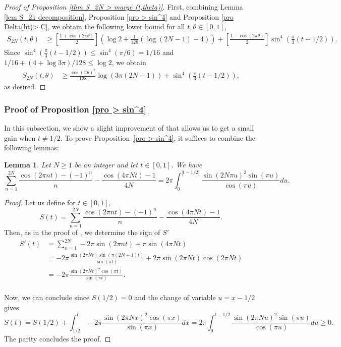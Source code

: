 \documentclass[12pt]{amsart}
\newtheorem{lem}[thm]{Lemma}
\theoremstyle{definition}
\numberwithin{equation}{section}
\numberwithin{equation}{section}
\begin{document}
\begin{proof}[Proof of Proposition \ref{thm S_2N > marge (t,theta)}]
First, combining Lemma \ref{lem S_2k decomposition},
Proposition \ref{pro > sin^4} and
Proposition \ref{pro Delta(ht)> C}, we obtain the following lower bound for all $t, \theta\in [0,1]$,
\begin{align*}
    S_{2N}(t,\theta)
    &\geq  
    \left[\frac{1+\cos(2\pi \theta)}{2}\right]\left(\log 2 +\frac{1}{128}(\log(2N-1)-4)\right)
    +\left[\frac{1-\cos(2\pi \theta)}{2}\right]\sin^4\left(\frac{\pi}{3}(t-1/2)\right).
\end{align*}
Since $\sin^4\left(\frac{\pi}{3}(t-1/2)\right)\leq \sin^4(\pi/6) = 1/16$ and $1/16+(4+\log 3\pi)/128\leq \log 2$, we obtain 
\begin{align*}
    S_{2N}(t,\theta)
    &\geq  
    \frac{\cos(\pi\theta)^2}{128}\log(3\pi(2N-1))
    +\sin^4\left(\frac{\pi}{3}(t-1/2)\right),
\end{align*} as desired.
\end{proof}


\subsubsection{Proof of Proposition \ref{pro > sin^4}}
In this subsection, we show a slight improvement of \cite[Lemma 4.2]{ABL21} that allows us to get a small gain when $t\ne 1/2$. 
To prove Proposition~\ref{pro > sin^4}, it suffices to combine the following lemmas:
\begin{lem} Let \(N\geq1\) be an integer and let \(t\in[0,1]\). We have
    \[
    \sum_{n=1}^{2N} \frac{\cos(2\pi nt)-(-1)^n}{n} - \frac{\cos(4\pi N t)-1}{4N}
    =2\pi \int_{0}^{|t-1/2|} \frac{\sin(2N\pi u)^2\sin(\pi u)}{\cos(\pi u)}du.
    \]
\end{lem}
\begin{proof}
     Let us define for $t \in [0,1]$, 
     \[
     S(t) = \sum_{n=1}^{2N} \frac{\cos(2\pi nt)-(-1)^n}{n} - \frac{\cos(4\pi N t)-1}{4N}.
     \]
     Then, as in the proof of \cite[Lemma 4.2]{ABL21}, we determine the sign of \(S'\) 
\begin{align*}
     S'(t)&= \sum_{n=1}^{2N} -2\pi \sin(2\pi nt)+ \pi\sin(4\pi N t)\\
     &=  -2\pi\frac{\sin(2\pi N t)\sin(\pi(2N+1)t) }{\sin(\pi t)}+ 2\pi\sin(2\pi N t)\cos(2\pi Nt)\\
     &=  -2\pi\frac{\sin(2\pi N t)^2\cos(\pi t)
     }{\sin(\pi t)}.\\
\end{align*}

Now, we can conclude since $S(1/2) = 0$ and the change of variable $u = x-1/2$ gives
\[
S(t) = S(1/2)+\int_{1/2}^{t} -2\pi\frac{\sin(2\pi N x)^2\cos(\pi x)}{\sin(\pi x)} dx = 2\pi\int_{0}^{t-1/2} \frac{\sin(2\pi N u)^2\sin(\pi u)}{\cos(\pi u)} du\geq 0.
\]
The parity concludes the proof.
\end{proof}
\end{document}
